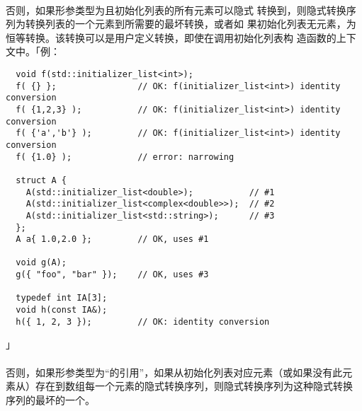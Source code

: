 \paragraph{}
否则，如果形参类型为且初始化列表的所有元素可以隐式
转换到，则隐式转换序列为转换列表的一个元素到所需要的最坏转换，或者如
果初始化列表无元素，为恒等转换。该转换可以是用户定义转换，即使在调用初始化列表构
造函数的上下文中。「例：
\begin{lstlisting}
  void f(std::initializer_list<int>);
  f( {} };                // OK: f(initializer_list<int>) identity conversion
  f( {1,2,3} );           // OK: f(initializer_list<int>) identity conversion
  f( {'a','b'} );         // OK: f(initializer_list<int>) identity conversion
  f( {1.0} );             // error: narrowing

  struct A {
    A(std::initializer_list<double>);           // #1
    A(std::initializer_list<complex<double>>);  // #2
    A(std::initializer_list<std::string>);      // #3
  };
  A a{ 1.0,2.0 };         // OK, uses #1

  void g(A);
  g({ "foo", "bar" });    // OK, uses #3

  typedef int IA[3];
  void h(const IA&);
  h({ 1, 2, 3 });         // OK: identity conversion
\end{lstlisting}」

\paragraph{}
否则，如果形参类型为``的引用''，如果从初始化列表对应元素（或如果没有此元
素从\tm{\{\}}）存在到数组每一个元素的隐式转换序列，则隐式转换序列为这种隐式转换
序列的最坏的一个。

